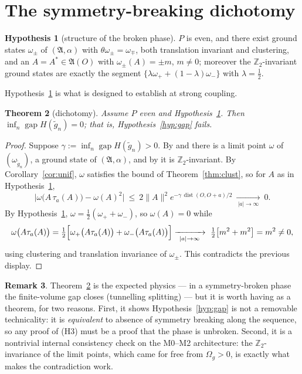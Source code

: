 \documentclass[11pt,a4paper]{article}
\theoremstyle{plain}
\newtheorem{theorem}{Theorem}[section]
\theoremstyle{definition}
\newtheorem{remark}[theorem]{Remark}
\newtheorem{hypothesis}[theorem]{Hypothesis}
\newcommand{\A}{\mathfrak{A}}
\newcommand{\Z}{\mathbb{Z}}
\newcommand{\Om}{\Omega}
\DeclareMathOperator{\dist}{dist}
\DeclareMathOperator{\gapop}{gap}
\begin{document}
\section{The symmetry-breaking dichotomy}\label{sec:dich}

\begin{hypothesis}[structure of the broken phase]\label{hyp:broken}
$P$ is even, and there exist ground states $\omega_\pm$ of $(\A,\alpha)$ with
$\theta\omega_\pm=\omega_\mp$, both translation invariant and clustering, and an
$A=A^*\in\A(O)$ with $\omega_\pm(A)=\pm m$, $m\ne0$; moreover the $\Z_2$-invariant ground states
are exactly the segment $\{\lambda\omega_++(1-\lambda)\omega_-\}$ with $\lambda=\tfrac12$.
\end{hypothesis}

Hypothesis~\ref{hyp:broken} is what \cite{GJS76} is designed to establish at strong coupling.

\begin{theorem}[dichotomy]\label{thm:dich}
Assume $P$ even and Hypothesis~\ref{hyp:broken}. Then
$\inf_n\gapop H(\tilde g_n)=0$; that is, Hypothesis~\ref{hyp:gap} fails.
\end{theorem}

\begin{proof}
Suppose $\gamma:=\inf_n\gapop H(\tilde g_n)>0$. By \cite[Cor.~4.3]{M0} and \cite[Cor.~4.1]{M1}
there is a limit point $\omega$ of $(\omega_{\tilde g_n})$, a ground state of $(\A,\alpha)$, and by
\cite[Lem.~3.3]{M0} it is $\Z_2$-invariant. By Corollary~\ref{cor:unif}, $\omega$ satisfies the
bound of Theorem~\ref{thm:clust}, so for $A$ as in Hypothesis~\ref{hyp:broken},
\[
  \bigl|\omega\bigl(A\,\tau_a(A)\bigr)-\omega(A)^2\bigr|\ \le\ 2\|A\|^2e^{-\gamma\,\dist(O,O+a)/2}
  \ \xrightarrow[\ |a|\to\infty\ ]{}\ 0 .
\]
By Hypothesis~\ref{hyp:broken}, $\omega=\tfrac12(\omega_++\omega_-)$, so $\omega(A)=0$ while
\[
  \omega\bigl(A\tau_a(A)\bigr)=\tfrac12\Bigl[\omega_+\bigl(A\tau_a(A)\bigr)+\omega_-\bigl(A\tau_a(A)\bigr)\Bigr]
  \xrightarrow[\ |a|\to\infty\ ]{}\ \tfrac12\bigl[m^2+m^2\bigr]=m^2\ne0,
\]
using clustering and translation invariance of $\omega_\pm$. This contradicts the previous display.
\end{proof}

\begin{remark}
Theorem~\ref{thm:dich} is the expected physics --- in a symmetry-broken phase the finite-volume
gap closes (tunnelling splitting) --- but it is worth having as a theorem, for two reasons. First,
it shows Hypothesis~\ref{hyp:gap} is not a removable technicality: it is \emph{equivalent} to
absence of symmetry breaking along the sequence, so any proof of (H3) must be a proof that the
phase is unbroken. Second, it is a nontrivial internal consistency check on the M0--M2
architecture: the $\Z_2$-invariance of the limit points, which came for free from
$\Om_g>0$, is exactly what makes the contradiction work.
\end{remark}
\end{document}
